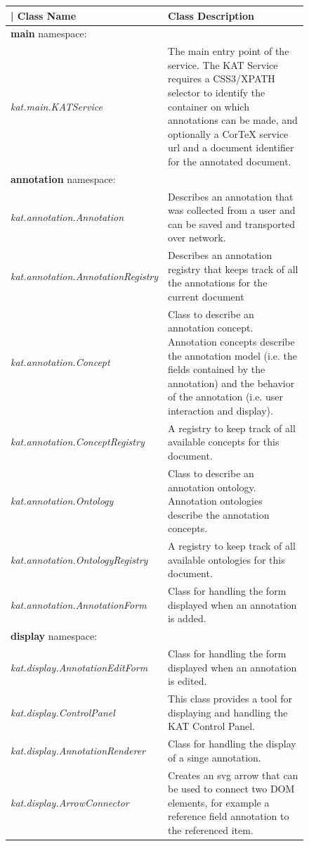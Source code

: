 \documentclass[a4paper, 12pt, notitlepage]{report}
\def\KAT{\textsf{KAT}\xspace}
\begin{document}
\begin{figure}[ht]
\begin{longtable}{p{6cm}|p{8cm}}|%
 \large{\textbf{Class Name}} & \large{\textbf{Class Description}}\\\hline
 \textbf{main} namespace: \\\hline
 \textit{kat.main.KATService} & The main entry point of the service. The \KAT Service requires a CSS3/XPATH selector to identify the container on which annotations can be made,
 and optionally a CorTeX service url and a document identifier for the annotated document.\\\hline
 \textbf{annotation} namespace: \\\hline
 \textit{kat.annotation.Annotation} & Describes an annotation that was collected from a user and can be saved and transported over
 network.\\\hline
 \textit{kat.annotation.AnnotationRegistry} & Describes an annotation registry that keeps track of all the annotations for the current document \\\hline
 \textit{kat.annotation.Concept} & Class to describe an annotation concept. Annotation concepts describe the annotation model (i.e. the fields contained
 by the annotation) and the behavior of the annotation (i.e. user interaction and display).\\\hline
 \textit{kat.annotation.ConceptRegistry} & A registry to keep track of all available concepts for this document.\\\hline
 \textit{kat.annotation.Ontology} & Class to describe an annotation ontology. Annotation ontologies describe the annotation concepts.\\\hline
 \textit{kat.annotation.OntologyRegistry} & A registry to keep track of all available ontologies for this document.\\\hline
 \textit{kat.annotation.AnnotationForm} & Class for handling the form displayed when an annotation is added.\\\hline
 \textbf{display} namespace: \\\hline
 \textit{kat.display.AnnotationEditForm} & Class for handling the form displayed when an annotation is edited.\\\hline
 \textit{kat.display.ControlPanel} & This class provides a tool for displaying and handling the \KAT Control Panel.\\\hline
 \textit{kat.display.AnnotationRenderer} & Class for handling the display of a singe annotation.\\\hline
 \textit{kat.display.ArrowConnector} &  Creates an svg arrow that can be used to connect two DOM elements, for example a reference field annotation to the referenced item.\\\hline

\end{longtable}
\end{figure}
\end{document}
